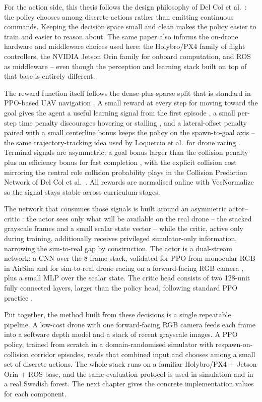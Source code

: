 \documentclass[../main.tex]{subfiles}
\begin{document}
For the action side, this thesis follows the design philosophy of Del Col et al.\ \cite{DelCol2025}: the policy chooses among discrete actions rather than emitting continuous commands. Keeping the decision space small and clean makes the policy easier to train and easier to reason about. The same paper also informs the on-drone hardware and middleware choices used here: the Holybro/PX4 family of flight controllers, the NVIDIA Jetson Orin family for onboard computation, and ROS as middleware -- even though the perception and learning stack built on top of that base is entirely different.

The reward function itself follows the dense-plus-sparse split that is standard in PPO-based UAV navigation \cite{Schulman2017,Kabas2022}. A small reward at every step for moving toward the goal gives the agent a useful learning signal from the first episode \cite{Kabas2022}, a small per-step time penalty discourages hovering or stalling \cite{Kabas2022}, and a lateral-offset penalty paired with a small centerline bonus keeps the policy on the spawn-to-goal axis -- the same trajectory-tracking idea used by Loquercio et al.\ for drone racing \cite{Loquercio2019}. Terminal signals are asymmetric: a goal bonus larger than the collision penalty plus an efficiency bonus for fast completion \cite{Kabas2022}, with the explicit collision cost mirroring the central role collision probability plays in the Collision Prediction Network of Del Col et al.\ \cite{DelCol2025}. All rewards are normalised online with VecNormalize so the signal stays stable across curriculum stages.

The network that consumes those signals is built around an asymmetric actor--critic \cite{Pinto2017}: the actor sees only what will be available on the real drone -- the stacked grayscale frames and a small scalar state vector -- while the critic, active only during training, additionally receives privileged simulator-only information, narrowing the sim-to-real gap by construction. The actor is a dual-stream network: a CNN over the 8-frame stack, validated for PPO from monocular RGB in AirSim \cite{Kabas2022} and for sim-to-real drone racing on a forward-facing RGB camera \cite{Loquercio2019}, plus a small MLP over the scalar state. The critic head consists of two 128-unit fully connected layers, larger than the policy head, following standard PPO practice \cite{Schulman2017,Pinto2017}.

Put together, the method built from these decisions is a single repeatable pipeline. A low-cost drone with one forward-facing RGB camera feeds each frame into a software depth model and a stack of recent grayscale images. A PPO policy, trained from scratch in a domain-randomised simulator with respawn-on-collision corridor episodes, reads that combined input and chooses among a small set of discrete actions. The whole stack runs on a familiar Holybro/PX4 + Jetson Orin + ROS base, and the same evaluation protocol is used in simulation and in a real Swedish forest. The next chapter gives the concrete implementation values for each component.
\end{document}
